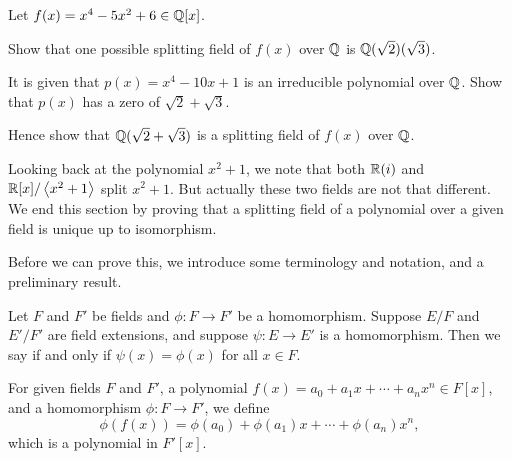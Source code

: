 \begin{exercise}\label{exercise-splitting-field-sqrt2-sqrt3}
    Let $f(x) = x^4 - 5x^2 + 6 \in \mathbb{Q}[x]$.
    \begin{partquestions}{\roman*}
        \item Show that one possible splitting field of $f(x)$ over $\mathbb{Q}$ is $\mathbb{Q}(\sqrt2)(\sqrt3)$.
        \item It is given that $p(x) = x^4 - 10x + 1$ is an irreducible polynomial over $\mathbb{Q}$. Show that $p(x)$ has a zero of $\sqrt2 + \sqrt3$.
        \item Hence show that $\mathbb{Q}(\sqrt2 + \sqrt3)$ is a splitting field of $f(x)$ over $\mathbb{Q}$.
    \end{partquestions}
\end{exercise}

Looking back at the polynomial $x^2+1$, we note that both $\mathbb{R}(i)$ and $\mathbb{R}[x]/\left\langle x^2+1\right\rangle$ split $x^2+1$. But actually these two fields are not that different. We end this section by proving that a splitting field of a polynomial over a given field is unique up to isomorphism.

Before we can prove this, we introduce some terminology and notation, and a preliminary result.

\begin{definition}
    Let $F$ and $F'$ be fields and $\phi: F \to F'$ be a homomorphism. Suppose $E/F$ and $E'/F'$ are field extensions, and suppose $\psi: E \to E'$ is a homomorphism. Then we say  if and only if $\psi(x) = \phi(x)$ for all $x \in F$.
\end{definition}

\begin{definition}
    For given fields $F$ and $F'$, a polynomial $f(x) = a_0 + a_1x + \cdots + a_nx^n \in F[x]$, and a homomorphism $\phi: F \to F'$, we define
    \[
        \phi(f(x)) = \phi(a_0) + \phi(a_1)x + \cdots + \phi(a_n)x^n,
    \]
    which is a polynomial in $F'[x]$.
\end{definition}

